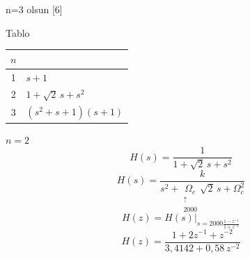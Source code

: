 \documentclass[11pt,a4paper]{article}
\begin{document}
n=3 olsun
[6]

Tablo
\begin{center}
\begin{tabular}{c|l}
$n$ & \\ \hline
1 & $s+1$ \\
2 & $1+\sqrt{2}\,s+s^{2}$ \\
3 & $(s^{2}+s+1)(s+1)$
\end{tabular}
\end{center}

$n=2$
\[ H(s) = \frac{1}{1+\sqrt{2}\,s+s^{2}} \]
\[ H(s) = \frac{k}{s^{2}+\underset{\substack{\uparrow\\ 2000}}{\Omega_c}\sqrt{2}\,s+\Omega_c^{2}} \]
\[ H(z) = H(s)\Big|_{s=2000\frac{1-z^{-1}}{1+z^{-1}}} \]
\[ H(z) = \frac{1+2z^{-1}+z^{-2}}{3{,}4142+0{,}58\,z^{-2}} \]
\end{document}
